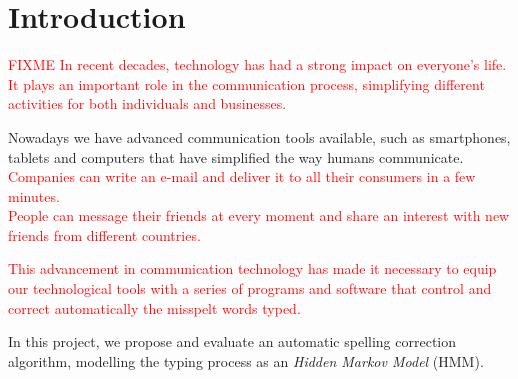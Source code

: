 \chapter{Introduction}
\label{chap:Introduction}

\textcolor{red}{FIXME In recent decades, technology has had a strong impact on everyone's life. It plays an important 
role in the communication process, simplifying different activities for both individuals and businesses.}

Nowadays we have advanced communication tools available, such as smartphones, tablets and computers that 
have simplified the way humans communicate. \\
\textcolor{red}{Companies can write an e-mail and deliver it to all their consumers in a few minutes. \\
People can message their friends at every moment and share an interest with new friends from different 
countries.}

\textcolor{red}{This advancement in communication technology has made it necessary to equip our technological tools with 
a series of programs and software that control and correct automatically the misspelt words typed.}

In this project, we propose and evaluate an automatic spelling correction algorithm, modelling the typing 
process as an \textit{Hidden Markov Model} (HMM). 
